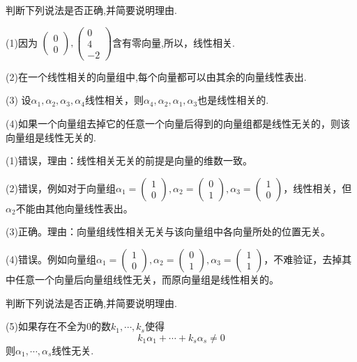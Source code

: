 \documentclass[a4paper]{report}
\begin{document}
\EX 判断下列说法是否正确,并简要说明理由.

(1)因为
$
\begin{pmatrix}
0\\ 0
\end{pmatrix},\begin{pmatrix}
               0\\ 4\\ -2
              \end{pmatrix}
$含有零向量,所以，线性相关.

(2)在一个线性相关的向量组中,每个向量都可以由其余的向量线性表出.

(3) 设$\alpha_1,\alpha_2,\alpha_3,\alpha_4$线性相关，则$\alpha_4,\alpha_2,\alpha_1,\alpha_3$也是线性相关的.

(4)如果一个向量组去掉它的任意一个向量后得到的向量组都是线性无关的，则该向量组是线性无关的.

\begin{jie}
(1)错误，理由：线性相关无关的前提是向量的维数一致。

(2)错误，例如对于向量组$\alpha_1=
\begin{pmatrix}
1\\ 0
\end{pmatrix}
,\alpha_2=
\begin{pmatrix}
0\\ 1
\end{pmatrix},\alpha_3=
\begin{pmatrix}
1\\ 0
\end{pmatrix}$，线性相关，但$\alpha_2$不能由其他向量线性表出。

(3)正确。理由：向量组线性相关无关与该向量组中各向量所处的位置无关。

(4)错误。例如向量组$\alpha_1=
\begin{pmatrix}
1\\ 0
\end{pmatrix}
,\alpha_2=
\begin{pmatrix}
0\\ 1
\end{pmatrix},\alpha_3=
\begin{pmatrix}
1\\ 1
\end{pmatrix}$，不难验证，去掉其中任意一个向量后向量组线性无关，而原向量组是线性相关的。
\end{jie}

\EX 判断下列说法是否正确,并简要说明理由.

(5)如果存在不全为$0$的数$k_1,\cdots,k_s$使得
\begin{equation*}
  k_1\alpha_1+\cdots+k_s\alpha_s\neq0
\end{equation*}
则$\alpha_1,\cdots,\alpha_s$线性无关.
\end{document}
